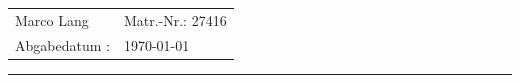 \begin{center}
{\fontsize{12pt}{12} \selectfont%
\begin{tabular}{ll}
Marco Lang & Matr.-Nr.: 27416\\[0.5ex] %
Abgabedatum :& \today   %
\end{tabular}
}
\end{center}
                               

\vspace{1cm}

\vspace{1cm}
\hrule



